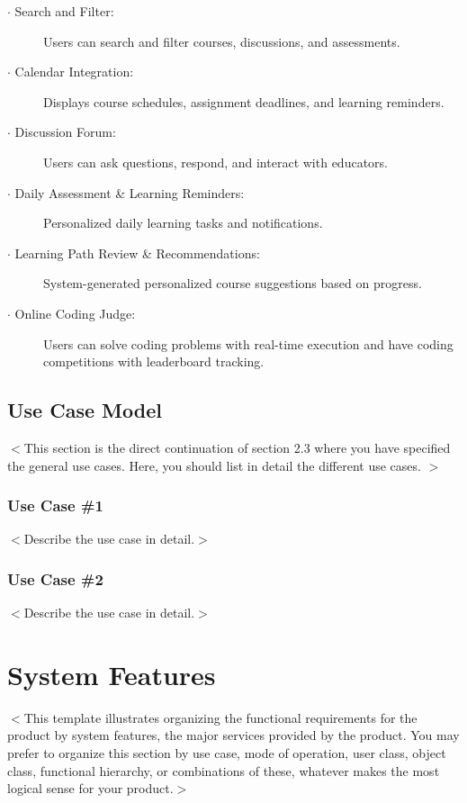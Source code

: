 \documentclass[a4paper, 11pt]{scrreprt}
\begin{document}
\begin{description}
\begin{enumerate}
        \end{enumerate}
    \item[$\cdot$ Search and Filter:] Users can search and filter courses, discussions, and assessments.
    \item[$\cdot$ Calendar Integration:] Displays course schedules, assignment deadlines, and learning reminders.
    \item[$\cdot$ Discussion Forum:] Users can ask questions, respond, and interact with educators.
    \item[$\cdot$ Daily Assessment \& Learning Reminders:] Personalized daily learning tasks and notifications.
    \item[$\cdot$ Learning Path Review \& Recommendations:] System-generated personalized course suggestions based on progress.
    \item[$\cdot$ Online Coding Judge:] Users can solve coding problems with real-time execution and have coding competitions with leaderboard tracking.
\end{description}

\section{Use Case Model}
$<$This section is the direct continuation of section 2.3 where you have specified 
the general use cases. Here, you should list in detail the different use cases. 
$>$
\subsection{Use Case \#1}
$<$Describe the use case in detail.$>$

\subsection{Use Case \#2}
$<$Describe the use case in detail.$>$



\chapter{System Features}
$<$This template illustrates organizing the functional requirements for the 
product by system features, the major services provided by the product. You may 
prefer to organize this section by use case, mode of operation, user class, 
object class, functional hierarchy, or combinations of these, whatever makes the 
most logical sense for your product.$>$
\end{document}
